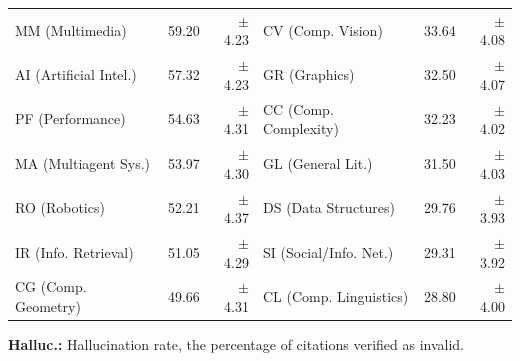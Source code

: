\begin{table}[t]
\begin{threeparttable}
\begin{tabular}{lrr@{\hskip 2em}lrr}
MM (Multimedia) & \cellcolor{red!24}59.20 & $\pm$4.23 & CV (Comp. Vision) & \cellcolor{red!14}33.64 & $\pm$4.08 \\
AI (Artificial Intel.) & \cellcolor{red!22}57.32 & $\pm$4.23 & GR (Graphics) & \cellcolor{red!14}32.50 & $\pm$4.07 \\
PF (Performance) & \cellcolor{red!22}54.63 & $\pm$4.31 & CC (Comp. Complexity) & \cellcolor{red!14}32.23 & $\pm$4.02 \\
MA (Multiagent Sys.) & \cellcolor{red!22}53.97 & $\pm$4.30 & GL (General Lit.) & \cellcolor{red!12}31.50 & $\pm$4.03 \\
RO (Robotics) & \cellcolor{red!22}52.21 & $\pm$4.37 & DS (Data Structures) & \cellcolor{red!12}29.76 & $\pm$3.93 \\
IR (Info. Retrieval) & \cellcolor{red!20}51.05 & $\pm$4.29 & SI (Social/Info. Net.) & \cellcolor{red!12}29.31 & $\pm$3.92 \\
CG (Comp. Geometry) & \cellcolor{red!20}49.66 & $\pm$4.31 & CL (Comp. Linguistics) & \cellcolor{red!12}28.80 & $\pm$4.00 \\
\bottomrule
\end{tabular}
    \begin{tablenotes}
      \footnotesize
      \item \colorbox{red!15}{\textbf{Halluc.:}} Hallucination rate, the percentage of citations verified as invalid.
    \end{tablenotes}
  \end{threeparttable}
\end{table}

